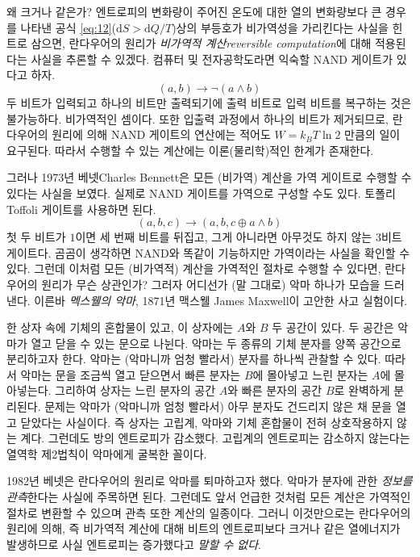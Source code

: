 \documentclass[a4paper,chapter,atbegshi]{oblivoir}
\begin{document}
왜 크거나 같은가? 엔트로피의 변화량이 주어진 온도에 대한 열의
변화량보다 큰 경우를 나타낸 공식 \ref{eq:12}($\textrm{d}S>\textrm{d}Q/T$)상의
부등호가 비가역성을 가리킨다는 사실을 힌트로 삼으면, 란다우어의 원리가
 \emph{비가역적 계산\tiny reversible computation}에 대해 적용된다는 사실을
 추론할 수 있겠다. 컴퓨터 및 전자공학도라면
익숙할 NAND 게이트가 있다고 하자. 
\[
  (a,b) \rightarrow \neg(a \wedge b)
\]
두 비트가 입력되고 하나의 비트만 출력되기에 출력 비트로 입력 비트를 복구하는
것은 불가능하다. 비가역적인 셈이다. 또한 입출력 과정에서 하나의 비트가 제거되므로,
란다우어의 원리에 의해 NAND 게이트의 연산에는 적어도 $W=k_BT\ln2$ 만큼의 일이
요구된다. 따라서 수행할 수 있는 계산에는 이론(물리학)적인 한계가 존재한다. 

그러나 1973년 베넷{\tiny Charles Bennett}은 모든 (비가역) 계산을 가역 게이트로
수행할 수 있다는 사실을 보였다. 실제로 NAND 게이트를 가역으로 구성할 
수도 있다. 토폴리{\tiny Toffoli} 게이트를 사용하면 된다. 
\[
  (a,b,c)\rightarrow(a,b,c\oplus a \wedge b)
\]
첫 두 비트가 $1$이면 세 번째 비트를 뒤집고, 그게 아니라면 아무것도
하지 않는 $3$비트 게이트다. 곰곰이 생각하면 NAND와 똑같이 기능하지만 가역이라는
사실을 확인할 수 있다. 그런데 이처럼 모든 (비가역적) 계산을 가역적인 절차로
수행할 수 있다면, 란다우어의 원리가 무슨 상관인가? 그러자 어디선가 (말 그대로)
악마 하나가 모습을 드러낸다. 이른바 \emph{멕스웰의 악마}, 1871년 맥스웰{\tiny
James Maxwell}이 고안한 사고 실험이다. 

한 상자 속에 기체의 혼합물이 있고, 이 상자에는 $A$와 $B$ 두 공간이 있다.
두 공간은 악마가 열고 닫을 수 있는 문으로 나뉜다. 악마는 두 종류의 기체 분자를
양쪽 공간으로 분리하고자 한다. 악마는 (악마니까 엄청 빨라서) 분자를 하나씩 관찰할
수 있다. 따라서 악마는 문을 조금씩 열고 닫으면서 빠른 분자는 $B$에 몰아넣고 느린
분자는 $A$에 몰아넣는다. 그리하여 상자는 느린 분자의 공간 $A$와 빠른 분자의 공간
$B$로 완벽하게 분리된다. 문제는 악마가 (악마니까 엄청 빨라서) 아무 분자도
건드리지 않은 채 문을 열고 닫았다는 사실이다. 즉 상자는 고립계, 악마와 기체
혼합물이 전혀 상호작용하지 않는 계다. 그런데도 방의 엔트로피가 감소했다.
고립계의 엔트로피는 감소하지 않는다는 열역학 제2법칙이 악마에게 굴복한 꼴이다. 

1982년 베넷은 란다우어의 원리로 악마를 퇴마하고자 했다. 악마가 분자에 관한
\emph{정보를 관측}한다는 사실에 주목하면 된다. 그런데도 앞서 언급한 것처럼 모든
계산은 가역적인 절차로 변환할 수 있으며 관측 또한 계산의 일종이다. 그러니 
이것만으로는 란다우어의 원리에 의해, 즉 비가역적 계산에 대해 비트의 엔트로피보다
크거나 같은 열에너지가 발생하므로 사실 엔트로피는 증가했다고 \emph{말할 수 없다}.
\end{document}
